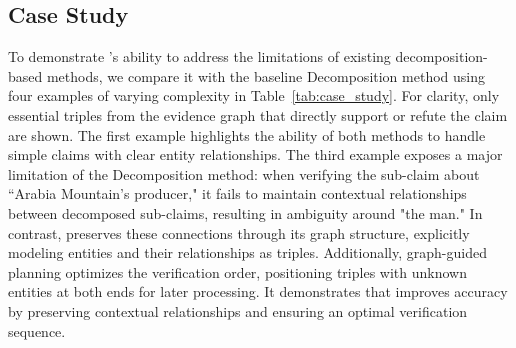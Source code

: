 \subsection{Case Study}\label{sec:case_study}
To demonstrate {\MyFC}'s ability to address the limitations of existing decomposition-based methods, we compare it with the baseline Decomposition method using four examples of varying complexity in Table~\ref{tab:case_study}. For clarity, only essential triples from the evidence graph that directly support or refute the claim are shown.
The first example highlights the ability of both methods to handle simple claims with clear entity relationships. The third example exposes a major limitation of the Decomposition method: when verifying the sub-claim about ``Arabia Mountain's producer," it fails to maintain contextual relationships between decomposed sub-claims, resulting in ambiguity around "the man." In contrast, {\MyFC} preserves these connections through its graph structure, explicitly modeling entities and their relationships as triples. Additionally, graph-guided planning optimizes the verification order, positioning triples with unknown entities at both ends for later processing. It demonstrates that {\MyFC} improves accuracy by preserving contextual relationships and ensuring an optimal verification sequence.


